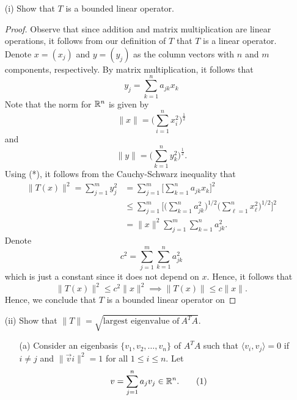 \documentclass[a4paper]{article}
\begin{document}
\begin{enumerate}
    \item[(i)] Show that \( T  \) is a bounded linear operator. 
        \begin{proof}
        Observe that since addition and matrix multiplication are linear operations, it follows from our definition of \( T  \) that \( T  \) is a linear operator. Denote \( x = ({x}_{j}) \) and \( y = ({y}_{j}) \) as the column vectors with \( n  \) and \( m  \) components, respectively. By matrix multiplication, it follows that
        \[  {y}_{j} =  \sum_{ k=1  }^{ n } {a}_{jk} {x}_{k} \tag{*}  \]
        Note that the norm for \( \mathbb{R}^{n} \) is given by
        \[  \|x\| = \Big(  \sum_{ i=1  }^{ n } {x}_{i}^{2} \Big)^{\frac{ 1 }{ 2 } } \]
        and
        \[  \|y\| = \Big(  \sum_{ k=1  }^{ n } {y}_{k}^{2} \Big)^{\frac{ 1 }{ 2 } }. \]
        Using (*), it follows from the Cauchy-Schwarz inequality that 
        \begin{align*}
            \|T(x)\|^{2} = \sum_{ j=1  }^{ m } {y}_{j}^{2} &= \sum_{ j=1  }^{ m } \Big[ \sum_{ k=1  }^{ n } {a}_{jk} {x}_{k } \Big]^{2}  \\
                                                           &\leq \sum_{ j=1  }^{ m } \Big[ \Big(  \sum_{ k=1  }^{ n } {a}_{jk}^{2} \Big)^{1/2} \Big(  \sum_{ \ell=1  }^{ n } {x}_{\ell}^{2} \Big)^{1/2} \Big]^{2} \\
                                                           &= \|x\|^{2} \sum_{ j=1  }^{ m } \sum_{ k=1  }^{ n  }{a}_{jk}^{2}.
        \end{align*}
        Denote 
        \[  c^{2} =  \sum_{ j=1  }^{ m } \sum_{ k=1  }^{ n } {a}_{jk}^{2}  \]
        which is just a constant since it does not depend on \( x  \). Hence, it follows that 
        \[  \|T(x)\|^{2} \leq c^{2} \|x\|^{2} \implies \|T(x)\| \leq c \|x\|. \]
        Hence, we conclude that \( T \) is a bounded linear operator on 
        \end{proof}
    \item[(ii)] Show that \( \|T\| = \sqrt{ \text{largest eigenvalue of} \ A^{T} A   }  \).
        \begin{enumerate}
            \item[(a)] Consider an eigenbasis \( \{{v}_{1}, {v}_{2}, \dots, {v}_{n}\}   \) of \( A^{T} A  \) such that \( \langle {v}_{i}, {v}_{j} \rangle  = 0 \) if \( i \neq j  \) and \( \|\vec{ v } i\|^{2} = 1  \) for all \( 1 \leq i \leq n  \). Let 
                \[  v = \sum_{ j=1  }^{ n } {a}_{j} {v}_{j} \in \mathbb{R}^{n}. \tag{1} \]

\end{enumerate}
\end{enumerate}
\end{document}
